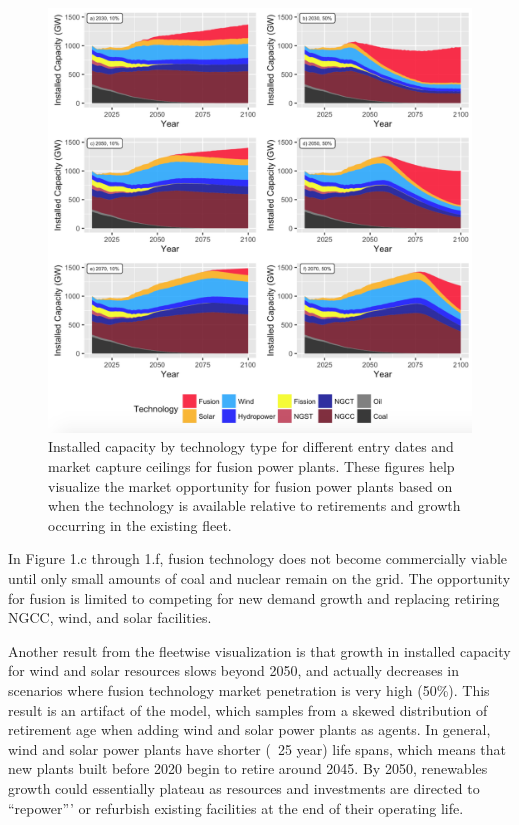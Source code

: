 \documentclass[preprint, 12pt]{elsarticle}
\begin{document}
\begin{figure}
\begin{center}
\includegraphics[scale=.35]{mainFig.png}
\end{center}
\caption{Installed capacity by technology type for different entry dates and market capture ceilings for fusion power plants. These figures help visualize the market opportunity for fusion power plants based on when the technology is available relative to retirements and growth occurring in the existing fleet.}
\end{figure}

In Figure 1.c through 1.f, fusion technology does not become commercially viable until only small amounts of coal and nuclear remain on the grid. The opportunity for fusion is limited to competing for new demand growth and replacing retiring NGCC, wind, and solar facilities. 

Another result from the fleetwise visualization is that growth in installed capacity for wind and solar resources slows beyond 2050, and actually decreases in scenarios where fusion technology market penetration is very high (50\%). This result is an artifact of the model, which samples from a skewed distribution of retirement age when adding wind and solar power plants as agents. In general, wind and solar power plants have shorter (~25 year) life spans, which means that new plants built before 2020 begin to retire around 2045. By 2050, renewables growth could essentially plateau as resources and investments are directed to “repower”’ or refurbish existing facilities at the end of their operating life.
\end{document}
